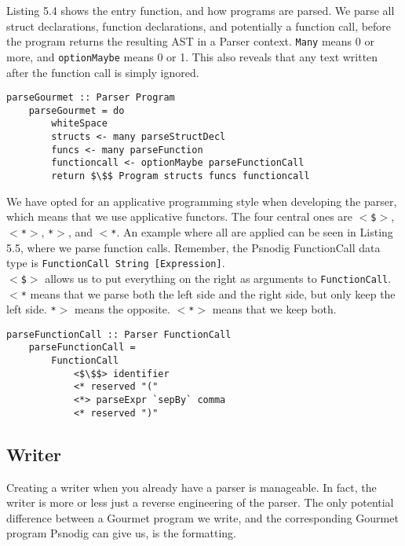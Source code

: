 Listing 5.4 shows the entry function, and how programs are parsed. We parse all struct declarations, function declarations, and potentially a function call, before the program returns the resulting AST in a Parser context. \texttt{Many} means 0 or more, and \texttt{optionMaybe} means 0 or 1. This also reveals that any text written after the function call is simply ignored. \hfill \\

\begin{lstlisting}[caption={Parsing Gourmet programs}, captionpos=b, frame=trbl]
    parseGourmet :: Parser Program
    parseGourmet = do
        whiteSpace
        structs <- many parseStructDecl
        funcs <- many parseFunction
        functioncall <- optionMaybe parseFunctionCall
        return $\$$ Program structs funcs functioncall
\end{lstlisting}

We have opted for an applicative programming style when developing the parser, which means that we use applicative functors. The four central ones are \texttt{$<$\$$>$}, \texttt{$<$*$>$}, \texttt{*$>$}, and \texttt{$<$*}. An example where all are applied can be seen in Listing 5.5, where we parse function calls. Remember, the Psnodig FunctionCall data type is \texttt{FunctionCall String [Expression]}. \hfill \\

\texttt{$<$\$$>$} allows us to put everything on the right as arguments to \texttt{FunctionCall}. \texttt{$<$*} means that we parse both the left side and the right side, but only keep the left side. \texttt{*$>$} means the opposite. \texttt{$<$*$>$} means that we keep both. \hfill \\

\begin{lstlisting}[caption={Parsing Gourmet function calls}, captionpos=b, frame=trbl]
    parseFunctionCall :: Parser FunctionCall
    parseFunctionCall =
        FunctionCall
            <$\$$> identifier
            <* reserved "("
            <*> parseExpr `sepBy` comma
            <* reserved ")"
\end{lstlisting}

\subsection{Writer}

Creating a writer when you already have a parser is manageable. In fact, the writer is more or less just a reverse engineering of the parser. The only potential difference between a Gourmet program we write, and the corresponding Gourmet program Psnodig can give us, is the formatting. \hfill \\

